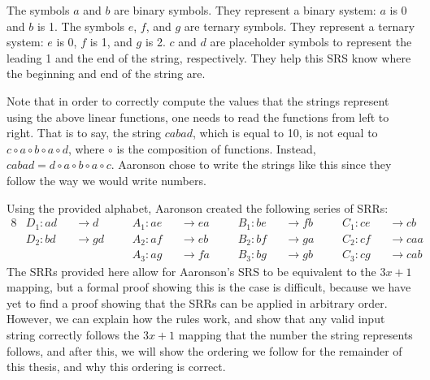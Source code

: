 The symbols $a$ and $b$ are binary symbols. They represent  a binary system: $a$ is 0 and $b$ is 1.  The symbols $e$, $f$, and $g$ are ternary symbols. They represent a ternary system: $e$ is 0, $f$ is 1, and $g$ is 2. $c$ and $d$ are placeholder symbols to represent the leading 1 and the end of the string, respectively. They help this SRS know where the beginning and end of the string are. \par
Note that in order to correctly compute the values that the strings represent using the above linear functions, one needs to read the functions from left to right. That is to say, the string $cabad$, which is equal to 10, is not equal to $ c \circ a \circ b \circ a \circ d$, where $\circ$ is the composition of functions. Instead, $cabad = d \circ a \circ b \circ a \circ c$. Aaronson chose to write the strings like this since they follow the way we would write numbers. \par
Using the provided alphabet, Aaronson created the following series of SRRs:
\begin{alignat*}{8}
    &D_1 : ad &&\rightarrow d\ \ && \ \ A_1 : ae &&\rightarrow ea\ \ && \ \ B_1 : be &&\rightarrow fb\ \ && \ \ C_1 : ce &&\rightarrow cb \\
    &D_2 : bd &&\rightarrow gd\ \ && \ \ A_2 : af &&\rightarrow eb\ \ && \ \ B_2 : bf &&\rightarrow ga\ \ && \ \ C_2 : cf &&\rightarrow caa \\
    &\ \ && \ \ && \ \  A_3 : ag &&\rightarrow fa\ \ && \ \  B_3 : bg &&\rightarrow gb\ \ && \ \ C_3 : cg &&\rightarrow cab
\end{alignat*}
The SRRs provided here allow for Aaronson's SRS to be equivalent to the $3x+1$ mapping, but a formal proof showing this is the case is difficult, because we have yet to find a proof showing that the SRRs can be applied in arbitrary order. However, we can explain how the rules work, and show that any valid input string correctly follows the $3x+1$ mapping that the number the string represents follows, and after this, we will show the ordering we follow for the remainder of this thesis, and why this ordering is correct. \par
